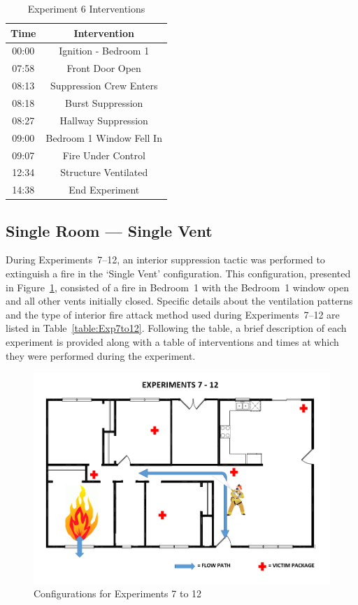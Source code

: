\documentclass[12pt,oneside]{book}
\begin{document}
\begin{table}[!ht]
	\centering
	\caption{Experiment 6 Interventions}
	\begin{tabular}{|c|c|} 
		\hline
		Time & Intervention \\ \hline \hline
		00:00 & Ignition - Bedroom 1 \\ \hline
		07:58 & Front Door Open \\ \hline
		08:13 & Suppression Crew Enters\\ \hline
		08:18 & Burst Suppression \\ \hline 
		08:27 & Hallway Suppression \\ \hline
		09:00 & Bedroom 1 Window Fell In \\ \hline
		09:07 & Fire Under Control 	\\ \hline
		12:34 & Structure Ventilated \\ \hline
		14:38 & End Experiment\\ \hline
	\end{tabular}
	\label{Table:Exp6Interventions}
\end{table}

\clearpage

\subsection{Single Room --- Single Vent}
During Experiments~7--12, an interior suppression tactic was performed to extinguish a fire in the `Single Vent' configuration. This configuration, presented in Figure~\ref{fig:Single_Vent_int}, consisted of a fire in Bedroom~1 with the Bedroom~1 window open and all other vents initially closed. Specific details about the ventilation patterns and the type of interior fire attack method used during Experiments~7--12 are listed in Table~\ref{table:Exp7to12}. Following the table, a brief description of each experiment is provided along with a table of interventions and times at which they were performed during the experiment. 

\begin{figure}[!ht]
	\centering
	\includegraphics[width=5in]{Figures/General/Exps7through12.png}
	\caption{Configurations for Experiments 7 to 12}
	\label{fig:Single_Vent_int}
\end{figure}
\end{document}
